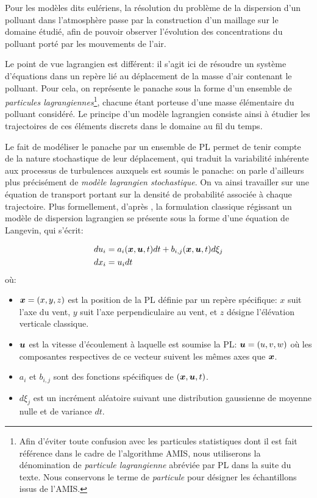 Pour les modèles dits eulériens, la résolution du problème de la dispersion d'un polluant dans l'atmosphère passe par la construction d'un maillage sur le domaine étudié, afin de pouvoir observer l'évolution des concentrations du polluant porté par les mouvements de l'air. 

Le point de vue lagrangien est différent: il s'agit ici de résoudre un système d'équations dans un repère lié au déplacement de la masse d'air contenant le polluant. Pour cela, on représente le panache sous la forme d'un ensemble de \textit{particules lagrangiennes}\footnote{Afin d'éviter toute confusion avec les particules statistiques dont il est fait référence dans le cadre de l'algorithme AMIS, nous utiliserons la dénomination  de \textit{particule lagrangienne} abréviée par PL dans la suite du texte. Nous conservons le terme de \textit{particule} pour désigner les échantillons issus de l'AMIS.}, chacune étant porteuse d'une masse élémentaire du polluant considéré. Le principe d'un modèle lagrangien consiste ainsi à étudier les trajectoires de ces éléments discrets dans le domaine au fil du temps.

Le fait de modéliser le panache par un ensemble de PL permet de tenir compte de la nature stochastique de leur déplacement, qui traduit la variabilité inhérente aux processus de turbulences auxquels est soumis le panache: on parle d'ailleurs plus précisément de \textit{modèle lagrangien stochastique}. On va ainsi travailler sur une équation de transport portant sur la densité de probabilité associée à chaque trajectoire. Plus formellement, d'après \cite{Flesch1995}, la formulation classique régissant un modèle de dispersion lagrangien se présente sous la forme d'une équation de Langevin, qui s'écrit: 

\begin{equation}
	\begin{split}
		du_i &= a_i({\bm{x}}, {\bm{u}}, t)dt + b_{i,j}({\bm{x}}, {\bm{u}}, t)d\xi_j  \\
		dx_i &= u_i dt
	\end{split}
	\label{eq_langevin}
\end{equation}
où:
 \begin{itemize}
	\item ${\bm{x}} = (x, y, z)$ est la position de la PL  définie par un repère spécifique: $x$ suit l'axe du vent, $y$ suit l'axe perpendiculaire au vent, et $z$ désigne l'élévation verticale classique. 
	\item ${\bm{u}}$ est la vitesse d'écoulement à laquelle est soumise la PL: ${\bm{u}} = (u, v, w)$ où les composantes respectives de ce vecteur suivent les mêmes axes que ${\bm{x}}$.
	\item $a_i$ et $b_{i,j}$ sont des fonctions spécifiques de $({\bm{x}}, {\bm{u}}, t)$.
	\item $d\xi_j$ est un incrément aléatoire suivant une distribution gaussienne de moyenne nulle et de variance $dt$.\\
\end{itemize}

